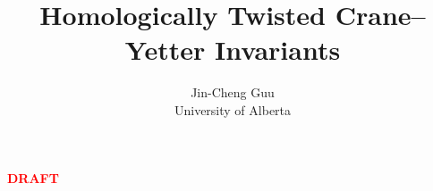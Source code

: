 \documentclass[11pt]{article}
\title{\bfseries Homologically Twisted Crane--Yetter Invariants}
\author{Jin-Cheng Guu\\University of Alberta}
\date{}
\theoremstyle{remark}
\theoremstyle{definition}
\begin{document}
\maketitle
\vspace{-2.5em}

\begin{center}
  \textcolor{red}{\bfseries\Large DRAFT}
\end{center}
\vspace{-0.75em}





\label{page:introduction}

















\end{document}

